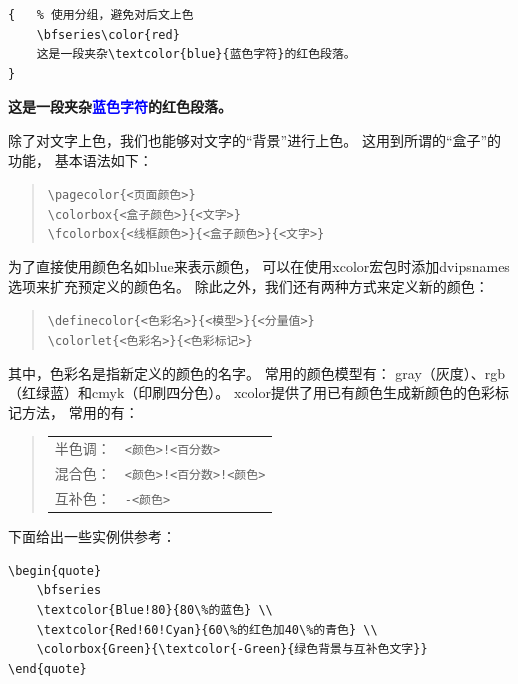 \documentclass{ctexart}
\numberwithin{equation}{section}			%
\begin{document}
\begin{lstlisting}
{	% 使用分组，避免对后文上色
	\bfseries\color{red}		
	这是一段夹杂\textcolor{blue}{蓝色字符}的红色段落。
}
\end{lstlisting}
	
	{	%
		\bfseries\color{red}		
		这是一段夹杂\textcolor{blue}{蓝色字符}的红色段落。
	}

	除了对文字上色，我们也能够对文字的“背景”进行上色。
	这用到所谓的“盒子”的功能，
	基本语法如下：
	
	\begin{quote}
		\verb|\pagecolor{<页面颜色>}| \\
		\verb|\colorbox{<盒子颜色>}{<文字>}| \\
		\verb|\fcolorbox{<线框颜色>}{<盒子颜色>}{<文字>}|
	\end{quote}
	
	为了直接使用颜色名如blue来表示颜色，
	可以在使用xcolor宏包时添加dvipsnames选项来扩充预定义的颜色名。
	除此之外，我们还有两种方式来定义新的颜色：
	
	\begin{quote}
		\verb|\definecolor{<色彩名>}{<模型>}{<分量值>}| \\
		\verb|\colorlet{<色彩名>}{<色彩标记>}|
	\end{quote}
	
	其中，色彩名是指新定义的颜色的名字。
	常用的颜色模型有：
	gray（灰度）、rgb（红绿蓝）和cmyk（印刷四分色）。
	xcolor提供了用已有颜色生成新颜色的色彩标记方法，
	常用的有：
	
	\begin{quote}
		\begin{tabular}{ll}
			半色调： & \verb|<颜色>!<百分数>| \\
			混合色： & \verb|<颜色>!<百分数>!<颜色>| \\
			互补色： & \verb|-<颜色>|
		\end{tabular}
	\end{quote}
	
	下面给出一些实例供参考：
	
\begin{lstlisting}
\begin{quote}
	\bfseries
	\textcolor{Blue!80}{80\%的蓝色} \\
	\textcolor{Red!60!Cyan}{60\%的红色加40\%的青色} \\
	\colorbox{Green}{\textcolor{-Green}{绿色背景与互补色文字}}
\end{quote}
\end{lstlisting}
	
\end{document}
